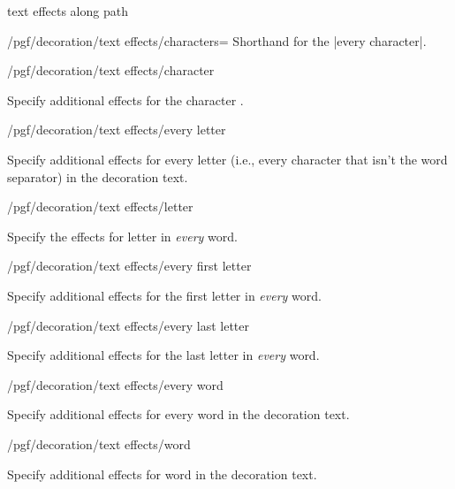 \begin{decoration}{text effects along path}
\begin{key}{/pgf/decoration/text effects/characters=}
	Shorthand for the |every character|.
	
\end{key}

\begin{stylekey}{/pgf/decoration/text effects/character }

  Specify additional effects for the character .
  
\end{stylekey}


\begin{stylekey}{/pgf/decoration/text effects/every letter}

	Specify additional effects for every letter (i.e., every character
	that isn't the word separator) in the decoration text.
	
\end{stylekey}

\begin{stylekey}{/pgf/decoration/text effects/letter }

  Specify the effects for letter  in \emph{every} word.
  
\end{stylekey}


\begin{stylekey}{/pgf/decoration/text effects/every first letter}

   Specify additional effects for the first letter in \emph{every} word.
   
\end{stylekey}


\begin{stylekey}{/pgf/decoration/text effects/every last letter}

   Specify additional effects for the last letter in \emph{every} word.
   
\end{stylekey}


\begin{stylekey}{/pgf/decoration/text effects/every word}

   Specify additional effects for every word in the decoration text.
   
\end{stylekey}



\begin{stylekey}{/pgf/decoration/text effects/word }

  Specify additional effects for word  in the decoration text.
  

\end{stylekey}
\end{decoration}
